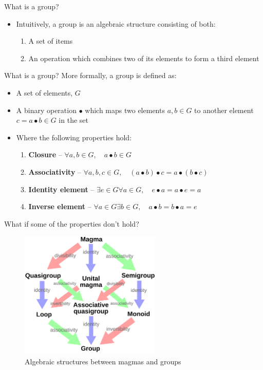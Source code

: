 \documentclass{beamer}
\begin{document}
\begin{frame}{What is a group?}
    \begin{itemize}
        \item Intuitively, a group is an algebraic structure consisting of both:
        \vskip 1cm
        \begin{enumerate}
            \item A set of items
            \item An operation which combines two of its elements to form a third element
        \end{enumerate}
    \end{itemize}
\end{frame}

\begin{frame}{What is a group?}
    More formally, a group is defined as:
    \begin{itemize}
        \item A set of elements, $G$
        \item A binary operation $\bullet$ which maps two elements $a,b \in G$ to another element $c = a \bullet b \in G$ in the set
        \item Where the following properties hold:
        \begin{enumerate}
            \item \textbf{Closure} -- $\forall a,b \in G, \quad a \bullet b \in G$
            \item \textbf{Associativity} -- $\forall a,b,c \in G, \quad (a \bullet b) \bullet c = a \bullet (b \bullet c)$
            \item \textbf{Identity element} -- $\exists e \in G \forall a \in G, \quad e \bullet a = a \bullet e = a$
            \item \textbf{Inverse element} -- $\forall a \in G \exists b \in G, \quad a \bullet b = b \bullet a = e$
        \end{enumerate}
    \end{itemize}
\end{frame}

\begin{frame}{What if some of the properties don't hold?}
    \begin{figure}
        \includegraphics[width=0.6\textwidth]{algebraic_structures.png}
        \caption{\label{fig:algebraic-structures}Algebraic structures between magmas and groups \cite{ethaniel_english_2020}}
    \end{figure}
\end{frame}
\end{document}
